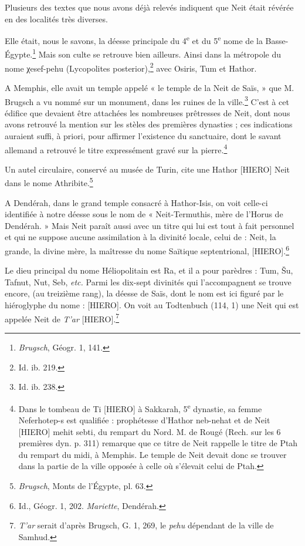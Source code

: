 \documentclass[a4paper, 11pt, oneside]{article}
\begin{document}
Plusieurs des textes que nous avons déjà relevés indiquent que Neit était révérée en des localités très diverses.

Elle était, nous le savons, la déesse principale du 4\textsuperscript{e} et du 5\textsuperscript{e} nome de la Basse-Égypte.\footnote{\emph{Brugsch}, Géogr. 1, 141.} Mais son culte se retrouve bien ailleurs. Ainsi dans la métropole du nome χesef-pehu (Lycopolites posterior),\footnote{Id. ib. 219.} avec Osiris, Tum et Hathor.

A Memphis, elle avait un temple appelé « le temple de la Neit de Saïs, » que M. Brugsch a vu nommé sur un monument, dans les ruines de la ville.\footnote{Id. ib. 238.} C'est à cet édifice que devaient être attachées les nombreuses prêtresses de Neit, dont nous avons retrouvé la mention sur les stèles des premières dynasties ; ces indications auraient suffi, à priori, pour affirmer l'existence du sanctuaire, dont le savant allemand a retrouvé le titre expressément gravé sur la pierre.\footnote{Dans le tombeau de Ti [HIERO] à Sakkarah, 5\textsuperscript{e} dynastie, sa femme Neferhotep-s est qualifiée : prophétesse d'Hathor neb-nehat et de Neit [HIERO] mehit sebti, du rempart du Nord. M. de Rougé (Rech. sur les 6 premières dyn. p. 311) remarque que ce titre de Neit rappelle le titre de Ptah du rempart du midi, à Memphis. Le temple de Neit devait donc se trouver dans la partie de la ville opposée à celle où s'élevait celui de Ptah.}

Un autel circulaire, conservé au musée de Turin, cite une Hathor [HIERO] Neit dans le nome Athribite.\footnote{\emph{Brugsch}, Monts de l'Égypte, pl. 63.}

A Dendérah, dans le grand temple consacré à Hathor-Isis, on voit celle-ci identifiée à notre déesse sous le nom de « Neit-Termuthis, mère de l'Horus de Dendérah. » Mais Neit paraît aussi avec un titre qui lui est tout à fait personnel et qui ne suppose aucune assimilation à la divinité locale, celui de : Neit, la grande, la divine mère, la maîtresse du nome Saïtique septentrional, [HIERO].\footnote{Id., Géogr. 1, 202. \emph{Mariette}, Dendérah.}

Le dieu principal du nome Héliopolitain est Ra, et il a pour parèdres : Tum, Šu, Tafnut, Nut, Seb, \emph{etc.} Parmi les dix-sept divinités qui l'accompagnent se trouve encore, (au treizième rang), la déesse de Saïs, dont le nom est ici figuré par le hiéroglyphe du nome : [HIERO]. On voit au Todtenbuch (114, 1) une Neit qui est appelée Neit de \emph{T'ar} [HIERO].\footnote{\emph{T'ar} serait d'après Brugsch, G. 1, 269, le \emph{pehu} dépendant de la ville de Samhud.}
\end{document}
